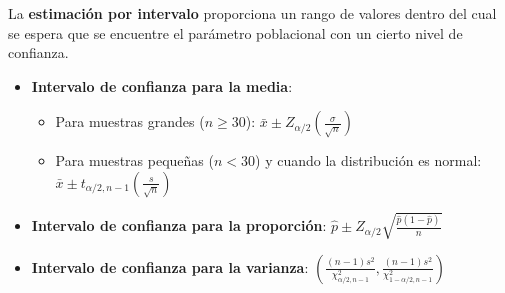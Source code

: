 \documentclass[
  letterpaper,
  DIV=11,
  numbers=noendperiod]{scrreprt}
\providecommand{\tightlist}{%
  \setlength{\itemsep}{0pt}\setlength{\parskip}{0pt}}\usepackage{longtable,booktabs,array}
\begin{document}
\begin{tcolorbox}[enhanced jigsaw, arc=.35mm, breakable, coltitle=black, left=2mm, opacityback=0, bottomtitle=1mm, colbacktitle=quarto-callout-note-color!10!white, title=\textcolor{quarto-callout-note-color}{\faInfo}\hspace{0.5em}{Estimación por intervalo}, titlerule=0mm, colback=white, colframe=quarto-callout-note-color-frame, bottomrule=.15mm, rightrule=.15mm, opacitybacktitle=0.6, toptitle=1mm, toprule=.15mm, leftrule=.75mm]

La \textbf{estimación por intervalo} proporciona un rango de valores
dentro del cual se espera que se encuentre el parámetro poblacional con
un cierto nivel de confianza.

\begin{itemize}
\tightlist
\item
  \textbf{Intervalo de confianza para la media}:

  \begin{itemize}
  \tightlist
  \item
    Para muestras grandes (\(n \ge 30\)):
    \(\bar{x} \pm Z_{\alpha/2} \left(\frac{\sigma}{\sqrt{n}}\right )\)\\
  \item
    Para muestras pequeñas (\(n < 30\)) y cuando la distribución es
    normal:
    \(\bar{x} \pm t_{\alpha/2, n-1} \left(\frac{s}{\sqrt{n}}\right)\)
  \end{itemize}
\item
  \textbf{Intervalo de confianza para la proporción}:
  \(\hat{p} \pm Z_{\alpha/2} \sqrt{\frac{\hat{p}(1-\hat{p})}{n}}\)
\item
  \textbf{Intervalo de confianza para la varianza}:
  \(\left( \frac{(n-1)s^2}{\chi^2_{\alpha/2, n-1}}, \frac{(n-1)s^2}{\chi^2_{1-\alpha/2, n-1}} \right)\)
\end{itemize}

\end{tcolorbox}
\end{document}
